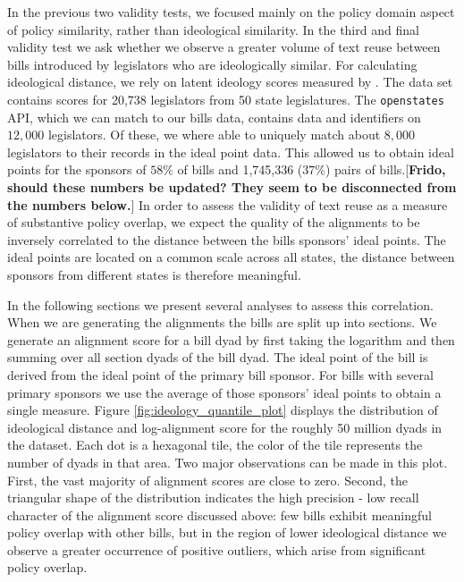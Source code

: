 \documentclass[12pt]{article} %
\begin{document}
In the previous two validity tests, we focused mainly on the policy domain aspect of policy similarity, rather than ideological similarity. In the third and final validity test we ask whether we observe a greater volume of text reuse between bills introduced by legislators who are ideologically similar. For calculating ideological distance, we rely on latent ideology scores measured by \citep{shor2011}. The data set contains scores for 20,738 legislators from 50 state legislatures. The \texttt{openstates} API, which we can match to our bills data, contains data and identifiers on $12,000$ legislators. Of these, we where able to uniquely match about $8,000$ legislators to their records in the ideal point data. This allowed us to obtain ideal points for the sponsors of $58\%$ of bills and 1,745,336 ($37\%$) pairs of bills.[{\bf Frido, should these numbers be updated? They seem to be disconnected from the numbers below.}] In order to assess the validity of text reuse as a measure of substantive policy overlap, we expect the quality of the alignments to be inversely correlated to the distance between the bills sponsors' ideal points. The ideal points are located on a common scale across all states, the distance between sponsors from different states is therefore meaningful. 

In the following sections we present several analyses to assess this correlation. When we are generating the alignments the bills are split up into sections. We generate an alignment score for a bill dyad by first taking the logarithm and then summing over all section dyads of the bill dyad. The ideal point of the bill is derived from the ideal point of the primary bill sponsor. For bills with several primary sponsors we use the average of those sponsors' ideal points to obtain a single measure. Figure \ref{fig:ideology_quantile_plot} displays the distribution of ideological distance and log-alignment score for the roughly 50 million dyads in the dataset. Each dot is a hexagonal tile, the color of the tile represents the number of dyads in that area. Two major observations can be made in this plot. First, the vast majority of alignment scores are close to zero. Second, the triangular shape of the distribution indicates the high precision - low recall character of the alignment score discussed above: few bills exhibit meaningful policy overlap with other bills, but in the region of lower ideological distance we observe a greater occurrence of positive outliers, which arise from significant policy overlap. 
\end{document}
